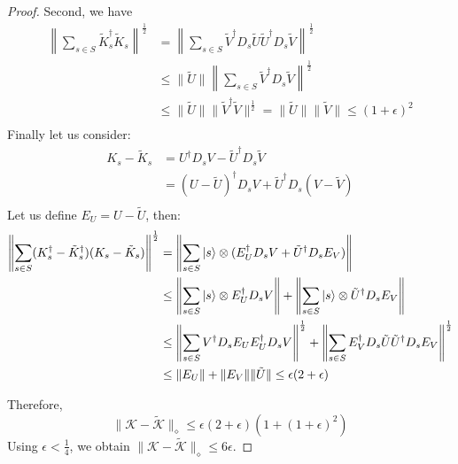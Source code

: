 \documentclass[aps,floatfix,10pt,amssymb,amsfont,amsmath,superscriptaddress,float,nofootinbib,longbibliography,nobalancelastpage,twocolumn]{revtex4-2}
\begin{document}
\begin{proof}
Second, we have
\begin{align}
    \left\|\sum_{s\in S}\tilde K_s^{\dagger} \tilde K_s \right\|^{\frac{1}{2}} &= \left\|\sum_{s\in S} \tilde V^{\dagger} D_s \tilde U\tilde U^{\dagger}  D_s \tilde V\right\|^{\frac{1}{2}} \\
     &\leq \|\tilde U\|\left\|\sum_{s\in S} \tilde V^{\dagger} D_s  \tilde V\right\|^{\frac{1}{2}}\\
     &\leq \|\tilde U\| \|\tilde V^{\dagger}  \tilde V\|^{\frac{1}{2}}= \|\tilde U\|\|\tilde V\| \leq (1+\epsilon)^2\\
\end{align}
Finally let us consider:
\begin{align}
    K_s-\tilde K_s &= U^{\dagger}  D_s V-\tilde U^{\dagger}  D_s \tilde V\\
    &=  (U-\tilde U)^{\dagger}  D_s V+\tilde U^{\dagger}  D_s (V-\tilde V)\\
\end{align}
Let us define $E_U = U - \tilde U$, then:
\begin{align}
    \left\|\sum_{s\in S}(K_s^\dagger - \tilde K_s^\dagger)(K_s - \tilde K_s)\right\|^{\frac{1}{2}}&= \left\| \sum_{s \in S}\ket{s} \otimes ( E_U^{\dagger}  D_s V+\tilde U^{\dagger}  D_sE_V)\right\|\\
    &\leq  \left\| \sum_{s \in S} \ket{s} \otimes E_U^{\dagger}  D_s V \right\| + \left\| \sum_{s \in S} \ket{s} \otimes \tilde U^{\dagger}  D_sE_V\right\|\\
    &\leq \left\| \sum_{s \in S}  V^{\dagger}  D_sE_UE_U^{\dagger} D_s  V\right\|^{\frac{1}{2}} +  \left\| \sum_{s \in S} E_V^{\dagger}  D_s \tilde U \tilde U^{\dagger} D_s E_V \right\|^{\frac{1}{2}}\\
    &\leq \|E_U\| + \|E_V\|\|\tilde U\| \leq \epsilon(2+\epsilon)
\end{align}

Therefore,
\begin{equation}
    \|\mathcal{K} - \tilde{\mathcal{K}}\|_{\diamond} \leq \epsilon(2+\epsilon)(1+(1+\epsilon)^2)
\end{equation}
Using $\epsilon<\frac14$, we obtain $\|\mathcal{K} - \tilde {\mathcal{K}}\|_{\diamond} \leq 6\epsilon$.
\end{proof}
\end{document}
